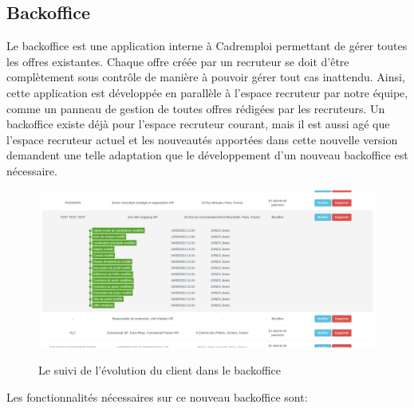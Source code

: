 \subsection{Backoffice}
\label{sub:Backoffice}
Le backoffice est une application interne à Cadremploi permettant de gérer toutes les offres existantes.
Chaque offre créée par un recruteur se doit d'être complètement sous contrôle de manière à pouvoir gérer tout cas inattendu.
Ainsi, cette application est développée en parallèle à l'espace recruteur par notre équipe, comme un panneau de gestion de toutes offres rédigées par les recruteurs.
Un backoffice existe déjà pour l'espace recruteur courant, mais il est aussi agé que l'espace recruteur actuel et les nouveautés apportées dans cette nouvelle version demandent une telle adaptation que le développement d'un nouveau backoffice est nécessaire.
\begin{figure}[b]
  \begin{center}
    \hspace*{-1in}
    \includegraphics[width=1.3\textwidth]{Pictures/backoffice.png}
    \label{pic:suivi client backoffice}
    \caption{Le suivi de l'évolution du client dans le backoffice}
  \end{center}
\end{figure}
Les fonctionnalités nécessaires sur ce nouveau backoffice sont:
